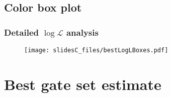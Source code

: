 \documentclass{beamer}
\begin{document}
{\subsection{Color box plot}
\begin{frame}
\frametitle{Detailed $\log{\mathcal{L}}$ analysis}

\begin{figure}
\begin{center}
\texttt{[image: slidesC\_files/bestLogLBoxes.pdf]}
\end{center}
\end{figure}
\end{frame}

}{}

\section{Best gate set estimate}
\end{document}
